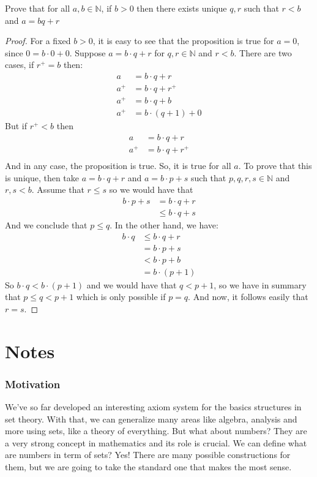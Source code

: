 \documentclass{tufte-handout}
\begin{document}
\begin{problem}
	Prove that for all $a, b \in \mathbb{N}$, if $b > 0$ then there exists unique $q, r$ such that $r < b$ and $a = bq + r$
\end{problem}
\begin{proof}
	For a fixed $b > 0$, it is easy to see that the proposition is true for $a = 0$, since $0 = b \cdot 0 + 0$. Suppose $a = b \cdot q + r$ for $q, r \in \mathbb{N}$ and $r < b$. There are two cases, if $r^+ = b$ then:
	\begin{align*}
		a &= b \cdot q + r\\
		a^+ &= b \cdot q + r^+\\
		a^+ &= b \cdot q + b\\
		a^+ &= b \cdot(q + 1) + 0
	\end{align*}
	But if $r^+ < b$ then
	\begin{align*}
		a &= b \cdot q + r\\
		a^+ &= b \cdot q + r^+\\
	\end{align*}
	And in any case, the proposition is true. So, it is true for all $a$. To prove that this is unique, then take $a = b \cdot q + r$ and $a = b \cdot p + s$ such that $p, q, r, s \in \mathbb{N}$ and $r, s < b$. Assume that $r \le s$ so we would have that
	\begin{align*}
		b \cdot p + s &= b \cdot q + r\\
		&\le b \cdot q + s 
	\end{align*}
	And we conclude that $p \le q$. In the other hand, we have:
	\begin{align*}
		b \cdot q &\le b \cdot q + r\\
		&= b\cdot p + s\\
		&< b\cdot p + b\\
		&= b\cdot(p + 1)
	\end{align*}
	So $b \cdot q < b \cdot (p + 1)$ and we would have that $ q < p +1$, so we have in summary that $p \le q < p + 1$ which is only possible if $p = q$. And now, it follows easily that $r = s$.
\end{proof}
\part{Notes}


\section{Motivation}
We've so far developed an interesting axiom system for the basics structures in set theory. With that, we can generalize many areas like algebra, analysis and more using sets, like a theory of everything. But what about numbers? They are a very strong concept in mathematics and its role is crucial. We can define what are numbers in term of sets? Yes! There are many possible constructions for them, but we are going to take the standard one that makes the most sense.\\
\end{document}
